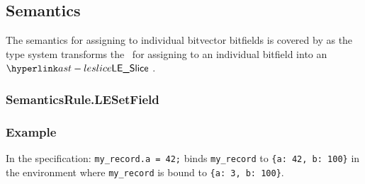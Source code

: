 \begin{mathpar}
\end{mathpar}

\subsection{Semantics}
The semantics for assigning to individual bitvector bitfields is covered by 
as the type system transforms the \untypedast\ for assigning to an individual bitfield into an $\LESlice$ \typedast.

\subsubsection{SemanticsRule.LESetField\label{sec:SemanticsRule.LESetField}}

\subsubsection{Example}
In the specification:
\texttt{my\_record.a = 42;} binds \texttt{my\_record} to \texttt{\{a: 42, b: 100\}} in the environment where \texttt{my\_record} is bound to \texttt{\{a: 3, b: 100\}}.

